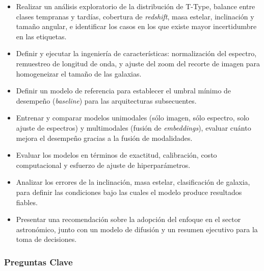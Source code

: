 \documentclass[12pt]{article}
\begin{document}
\begin{itemize}
    \item Realizar un análisis exploratorio de la distribución de T-Type, balance entre clases tempranas y tardías, cobertura de \textit{redshift}, masa estelar, inclinación y tamaño angular, e identificar los casos en los que existe mayor incertidumbre en las etiquetas.
    \item Definir y ejecutar la ingeniería de características: normalización del espectro, remuestreo de longitud de onda, y ajuste del zoom del recorte de imagen para homogeneizar el tamaño de las galaxias.
    \item Definir un modelo de referencia para establecer el umbral mínimo de desempeño (\textit{baseline}) para las arquitecturas subsecuentes.
    \item Entrenar y comparar modelos unimodales (sólo imagen, sólo espectro, solo ajuste de espectros) y multimodales (fusión de \textit{embeddings}), evaluar cuánto mejora el desempeño gracias a la fusión de modalidades.
    \item Evaluar los modelos en términos de exactitud, calibración, costo computacional y esfuerzo de ajuste de hiperparámetros.
    \item Analizar los errores de la inclinación, masa estelar, clasificación de galaxia, para definir las condiciones bajo las cuales el modelo produce resultados fiables.
    \item Presentar una recomendación sobre la adopción del enfoque en el sector astronómico, junto con un modelo de difusión y un resumen ejecutivo para la toma de decisiones.
\end{itemize}

\subsubsection{Preguntas Clave}
\end{document}
